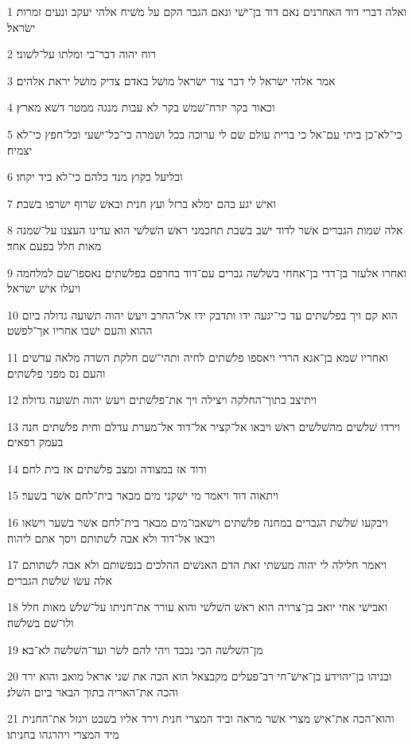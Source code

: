 \par 1 ואלה דברי דוד האחרנים נאם דוד בן־ישׁי ונאם הגבר הקם על משׁיח אלהי יעקב ונעים זמרות ישׂראל׃
\par 2 רוח יהוה דבר־בי ומלתו על־לשׁוני׃
\par 3 אמר אלהי ישׂראל לי דבר צור ישׂראל מושׁל באדם צדיק מושׁל יראת אלהים׃
\par 4 וכאור בקר יזרח־שׁמשׁ בקר לא עבות מנגה ממטר דשׁא מארץ׃
\par 5 כי־לא־כן ביתי עם־אל כי ברית עולם שׂם לי ערוכה בכל ושׁמרה כי־כל־ישׁעי וכל־חפץ כי־לא יצמיח׃
\par 6 ובליעל כקוץ מנד כלהם כי־לא ביד יקחו׃
\par 7 ואישׁ יגע בהם ימלא ברזל ועץ חנית ובאשׁ שׂרוף ישׂרפו בשׁבת׃
\par 8 אלה שׁמות הגברים אשׁר לדוד ישׁב בשׁבת תחכמני ראשׁ השׁלשׁי הוא עדינו העצנו על־שׁמנה מאות חלל בפעם אחד׃
\par 9 ואחרו אלעזר בן־דדי בן־אחחי בשׁלשׁה גברים עם־דוד בחרפם בפלשׁתים נאספו־שׁם למלחמה ויעלו אישׁ ישׂראל׃
\par 10 הוא קם ויך בפלשׁתים עד כי־יגעה ידו ותדבק ידו אל־החרב ויעשׂ יהוה תשׁועה גדולה ביום ההוא והעם ישׁבו אחריו אך־לפשׁט׃
\par 11 ואחריו שׁמא בן־אגא הררי ויאספו פלשׁתים לחיה ותהי־שׁם חלקת השׂדה מלאה עדשׁים והעם נס מפני פלשׁתים׃
\par 12 ויתיצב בתוך־החלקה ויצילה ויך את־פלשׁתים ויעשׂ יהוה תשׁועה גדולה׃
\par 13 וירדו שׁלשׁים מהשׁלשׁים ראשׁ ויבאו אל־קציר אל־דוד אל־מערת עדלם וחית פלשׁתים חנה בעמק רפאים׃
\par 14 ודוד אז במצודה ומצב פלשׁתים אז בית לחם׃
\par 15 ויתאוה דוד ויאמר מי ישׁקני מים מבאר בית־לחם אשׁר בשׁער׃
\par 16 ויבקעו שׁלשׁת הגברים במחנה פלשׁתים וישׁאבו־מים מבאר בית־לחם אשׁר בשׁער וישׂאו ויבאו אל־דוד ולא אבה לשׁתותם ויסך אתם ליהוה׃
\par 17 ויאמר חלילה לי יהוה מעשׂתי זאת הדם האנשׁים ההלכים בנפשׁותם ולא אבה לשׁתותם אלה עשׂו שׁלשׁת הגברים׃
\par 18 ואבישׁי אחי יואב בן־צרויה הוא ראשׁ השׁלשׁי והוא עורר את־חניתו על־שׁלשׁ מאות חלל ולו־שׁם בשׁלשׁה׃
\par 19 מן־השׁלשׁה הכי נכבד ויהי להם לשׂר ועד־השׁלשׁה לא־בא׃
\par 20 ובניהו בן־יהוידע בן־אישׁ־חי רב־פעלים מקבצאל הוא הכה את שׁני אראל מואב והוא ירד והכה את־האריה בתוך הבאר ביום השׁלג׃
\par 21 והוא־הכה את־אישׁ מצרי אשׁר מראה וביד המצרי חנית וירד אליו בשׁבט ויגזל את־החנית מיד המצרי ויהרגהו בחניתו׃
